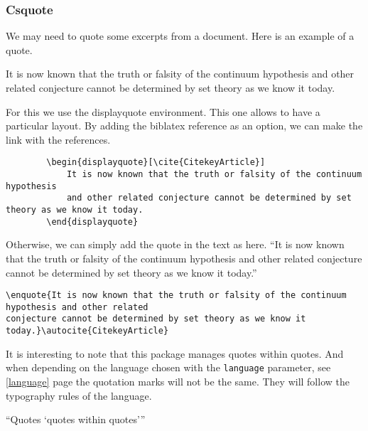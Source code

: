 \subsubsection{Csquote}
We may need to quote some excerpts from a document. Here is an example of a quote.
\begin{displayquote}
    It is now known that the truth or falsity of the continuum hypothesis
    and other related conjecture cannot be determined by set theory as we know it today.
\end{displayquote}

For this we use the displayquote environment. This one allows to have a particular layout.
By adding the biblatex reference as an option, we can make the link with the references.
\begin{code}
    \begin{verbatim}
        \begin{displayquote}[\cite{CitekeyArticle}]
            It is now known that the truth or falsity of the continuum hypothesis
            and other related conjecture cannot be determined by set theory as we know it today.
        \end{displayquote}
\end{verbatim}
    \caption{Use of displayquote}
\end{code}

Otherwise, we can simply add the quote in the text as here. \enquote{It is now known that the truth
    or falsity of the continuum hypothesis and other related conjecture cannot be determined by set
    theory as we know it today.} \autocite{CitekeyArticle}
\begin{code}
    \begin{verbatim}
\enquote{It is now known that the truth or falsity of the continuum hypothesis and other related
conjecture cannot be determined by set theory as we know it today.}\autocite{CitekeyArticle}
\end{verbatim}
    \caption{Use of enquote}
\end{code}

It is interesting to note that this package manages quotes within quotes. And when depending on the
language chosen with the \texttt{language} parameter, see \ref{language} page
\pageref{language} the quotation marks will not be the same. They will follow the typography rules
of the language.

\enquote{Quotes \enquote{quotes within quotes}}

